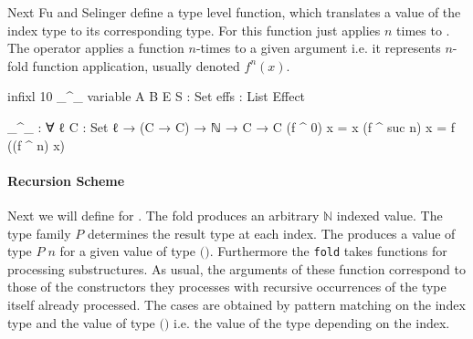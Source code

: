 Next Fu and Selinger define a type level function, which translates a value of
the index type to its corresponding type.
For
\AgdaSpace{}\AgdaSpace{}
this function just applies \AgdaSpace{}
$n$ times to .
The operator \AgdaFunction{\_\textasciicircum\_} applies a function $n$-times to
a given argument  i.e. it represents $n$-fold function
application, usually denoted $f^n(x)$.

\begin{code}[hide]
infixl 10 _^_
variable
  A B E S : Set
  effs : List Effect
\end{code}
\begin{code}
_^_ : ∀ {ℓ} {C : Set ℓ} → (C → C) → ℕ → C → C
(f ^ 0)      x = x
(f ^ suc n)  x = f ((f ^ n) x)
\end{code}

\paragraph{Recursion Scheme} Next we will define  for
\AgdaSpace{}\AgdaSpace{}.
The fold produces an arbitrary $\mathbb{N}$ indexed value.
The type family $P$ determines the result type at each index.
The  produces a value of type $P\;n$ for a given value of
type
$($\AgdaSpace{}\AgdaSpace{}\AgdaFunction{\textasciicircum}\AgdaSpace{}$)$\AgdaSpace{}.
Furthermore the \texttt{fold} takes functions for processing substructures.
As usual, the arguments of these function correspond to those of the
constructors they processes with recursive occurrences of the type itself already
processed.
The cases are obtained by pattern matching on the index type and the value of
type
$($\AgdaSpace{}\AgdaSpace{}\AgdaFunction{\textasciicircum}\AgdaSpace{}$)$\AgdaSpace{}
i.e. the value of the type depending on the index.

